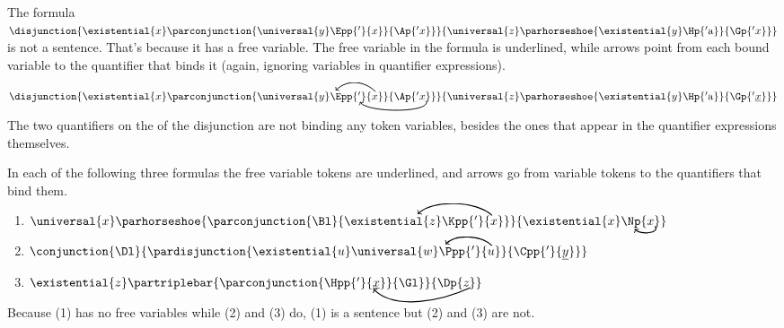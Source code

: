 \begin{majorILnc}{}
The formula $\disjunction{\existential{\variable{x}}\parconjunction{\universal{y}\Epp{'}{\variable{x}}}{\Ap{'\variable{x}}}}{\universal{\variable{z}}\parhorseshoe{\existential{\variable{y}}\Hp{'\constant{a}}}{\Gp{'\variable{x}}}}$ is not a sentence.
That's because it has a free variable. 
The free variable in the formula is underlined, while arrows point from each bound variable to the quantifier that binds it (again, ignoring variables in quantifier expressions). 

\smallskip
\begin{cenumerate}
\item $\disjunction{\existential{\variable{x}}\parconjunction{\universal{y}\Epp{'}{\variable{x}\NextLineRefC[black, distance=15, out=135, in=45]}}{\Ap{'\variable{x}}\NextLineRefH[black, distance=13, out=295, in=305]}}{\universal{\variable{z}}\parhorseshoe{\existential{\variable{y}}\Hp{'\constant{a}}}{\Gp{'\underline{\variable{x}}}}}$
\end{cenumerate}

\medskip
\noindent{}The two quantifiers on the  of the disjunction are not binding any token variables, besides the ones that appear in the quantifier expressions themselves.
\end{majorILnc}
\begin{majorILnc}{}
In each of the following three formulas the free variable tokens are underlined, and arrows go from variable tokens to the quantifiers that bind them.

\smallskip
\begin{enumerate}[label=(\arabic*), leftmargin=1.85\parindent,
labelindent=.35\parindent, labelsep=*, itemsep=8pt]
\item $\universal{\variable{x}}\parhorseshoe{\parconjunction{\Bl}{\existential{\variable{z}}\Kpp{'}{\variable{x}\NextLineRefF[black, distance=17, out=135, in=45]}}}{\existential{\variable{x}}\Np{\variable{x}}\NextLineRefK[black, out=-50, in=-50]}$
\item $\conjunction{\Dl}{\pardisjunction{\existential{\variable{u}}\universal{\variable{w}}\Ppp{'}{\variable{u}\NextLineRefC[black, distance=12, out=135, in=45]}}{\Cpp{'}{\underline{\variable{y}}}}}$
\item $\existential{\variable{z}}\partriplebar{\parconjunction{\Hpp{'}{\underline{\variable{x}}}}{\Gl}}{\Dp{\variable{z}}\NextLineRefI[black, distance=25, out=205, in=315]}$
\end{enumerate}

\medskip
\noindent{}Because (1) has no free variables while (2) and (3) do, (1) is a sentence but (2) and (3) are not. 
\end{majorILnc}

